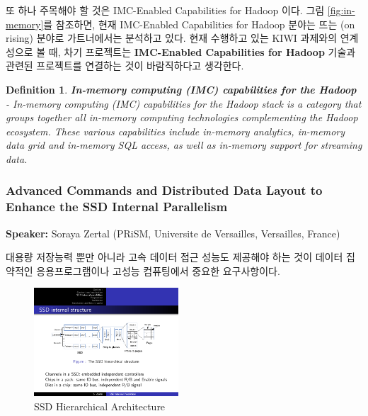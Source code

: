 \documentclass[twocolumn]{article}
\newtheorem{Def}{Definition}
\begin{document}
또 하나 주목해야 할 것은 IMC-Enabled Capabilities for Hadoop 이다. 
그림 \ref{fig:in-memory}를 참조하면, 현재 IMC-Enabled Capabilities for Hadoop 분야는 뜨는 (on rising) 분야로 가트너에서는 분석하고 있다.
현재 수행하고 있는 KIWI 과제와의 연계성으로 볼 때, 차기 프로젝트는  \textbf{IMC-Enabled Capabilities for Hadoop} 기술과 관련된 프로젝트를 연결하는 것이 바람직하다고 생각한다. 

\begin{Def}
\textbf{In-memory computing (IMC) capabilities for the Hadoop} - \textit{In-memory computing (IMC) capabilities for the Hadoop} stack is a category that groups together all in-memory computing technologies complementing the Hadoop ecosystem. These various capabilities include in-memory analytics, in-memory data grid and in-memory SQL access, as well as in-memory support for streaming data.
\end{Def}


\subsubsection{Advanced Commands and Distributed Data Layout to Enhance the SSD Internal Parallelism}
\textbf{Speaker:} Soraya Zertal (PRiSM, Universite de Versailles, Versailles, France)

대용량 저장능력 뿐만 아니라 고속 데이터 접근 성능도 제공해야 하는 것이 데이터 집약적인 응용프로그램이나 고성능 컴퓨팅에서 중요한 요구사항이다.

\begin{figure}[htb]
        \centering
        \includegraphics[width=0.48\textwidth]{ssd_arch.pdf}
        \caption{SSD Hierarchical Architecture}
        \label{fig:ssdarch}
\end{figure}
\end{document}
